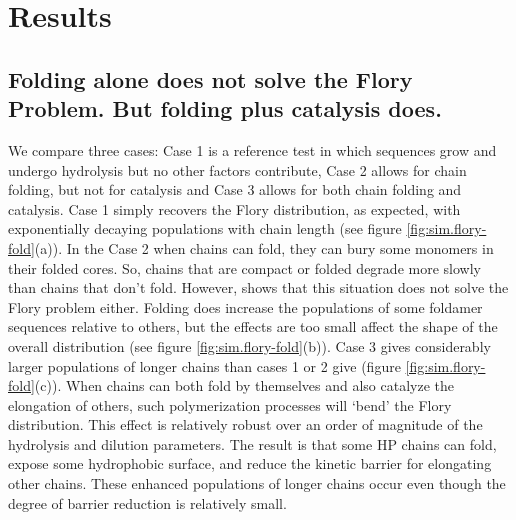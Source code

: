 \documentclass[5p,times]{elsarticle}
\begin{document}
\section{Results}

\subsection{Folding alone does not solve the Flory Problem.  But folding plus catalysis does.}

 We compare three cases:  Case 1 is a reference test in which sequences grow and undergo hydrolysis 
but no other factors 
contribute, Case 2 allows for chain folding, but not for catalysis and Case 3 allows for both chain 
folding and catalysis.  Case  1 simply recovers the Flory distribution, as expected, with 
exponentially decaying populations with chain 
length (see figure \ref{fig:sim.flory-fold}(a)).  In the Case 2 when chains can fold, they can 
bury some monomers in their folded cores.  So, chains that are compact or folded degrade more 
slowly than chains that don't fold.  However, 
shows that this situation does not solve the Flory problem either.  Folding does increase the 
populations of some foldamer sequences relative to others, but the effects are too small affect the 
shape of the overall distribution (see figure \ref{fig:sim.flory-fold}(b)).  
Case 3 gives considerably larger populations of longer chains than cases 1 or 2 give (figure 
\ref{fig:sim.flory-fold}(c)).  When chains 
can both fold by themselves and also catalyze the elongation of others, such polymerization 
processes will `bend' the Flory distribution.  This effect is relatively robust over an order of 
magnitude of the hydrolysis and dilution parameters.  The result is that some HP chains can fold, 
expose some hydrophobic surface, and reduce the kinetic barrier for elongating other chains.  These 
enhanced populations of longer chains occur even though the degree of barrier reduction is 
relatively small.
\end{document}
